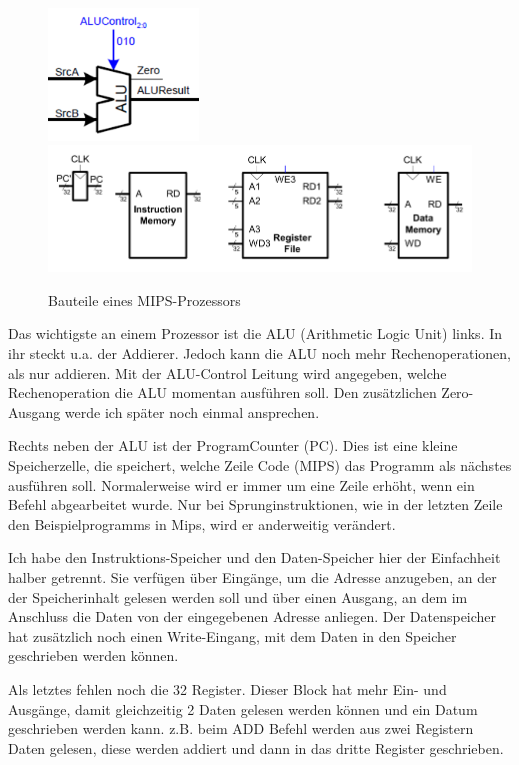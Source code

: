 \documentclass[12pt, a4paper]{article}
\begin{document}
\begin{figure}[H]
	\begin{center}
		\includegraphics [width=4cm]{ALU.png}
		\includegraphics [width=13cm]{Prozessor0.png}
	\end{center}
	\caption{Bauteile eines MIPS-Prozessors}
\end{figure}

Das wichtigste an einem Prozessor ist die ALU (Arithmetic Logic Unit) links. In ihr steckt u.a. der Addierer. Jedoch kann die ALU noch mehr Rechenoperationen, als nur addieren. Mit der ALU-Control Leitung wird angegeben, welche Rechenoperation die ALU momentan ausführen soll. Den zusätzlichen Zero-Ausgang werde ich später noch einmal ansprechen.

Rechts neben der ALU ist der ProgramCounter (PC). Dies ist eine kleine Speicherzelle, die speichert, welche Zeile Code (MIPS) das Programm als nächstes ausführen soll. Normalerweise wird er immer um eine Zeile erhöht, wenn ein Befehl abgearbeitet wurde. Nur bei Sprunginstruktionen, wie in der letzten Zeile den Beispielprogramms in Mips, wird er anderweitig verändert.

Ich habe den Instruktions-Speicher und den Daten-Speicher hier der Einfachheit halber getrennt. Sie verfügen über Eingänge, um die Adresse anzugeben, an der der Speicherinhalt gelesen werden soll und über einen Ausgang, an dem im Anschluss die Daten von der eingegebenen Adresse anliegen. Der Datenspeicher hat zusätzlich noch einen Write-Eingang, mit dem Daten in den Speicher geschrieben werden können.

Als letztes fehlen noch die 32 Register. Dieser Block hat mehr Ein- und Ausgänge, damit gleichzeitig 2 Daten gelesen werden können und ein Datum geschrieben werden kann. z.B. beim ADD Befehl werden aus zwei Registern Daten gelesen, diese werden addiert und dann in das dritte Register geschrieben.\\
\end{document}
